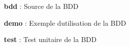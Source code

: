 
\begin{DoxyItemize}
\item {\bfseries bdd} \+: Source de la B\+DD
\item {\bfseries demo} \+: Exemple d\textquotesingle{}utilisation de la B\+DD
\item {\bfseries test} \+: Test unitaire de la B\+DD 
\end{DoxyItemize}